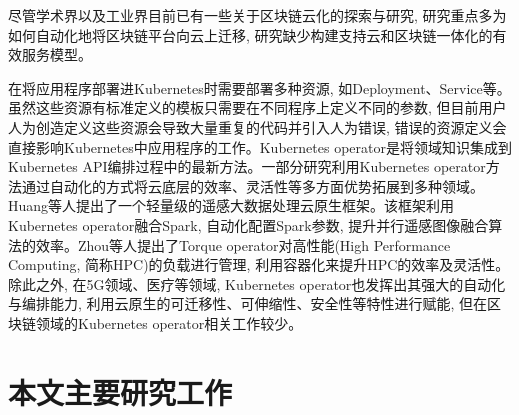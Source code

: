 尽管学术界以及工业界目前已有一些关于区块链云化的探索与研究, 研究重点多为如何自动化地将区块链平台向云上迁移, 研究缺少构建支持云和区块链一体化的有效服务模型\cite{9582270}。

在将应用程序部署进Kubernetes时需要部署多种资源, 如Deployment、Service等。虽然这些资源有标准定义的模板只需要在不同程序上定义不同的参数, 但目前用户人为创造定义这些资源会导致大量重复的代码并引入人为错误, 错误的资源定义会直接影响Kubernetes中应用程序的工作。Kubernetes operator是将领域知识集成到Kubernetes API编排过程中的最新方法\cite{henning2021reproducible}。一部分研究利用Kubernetes operator方法通过自动化的方式将云底层的效率、灵活性等多方面优势拓展到多种领域。Huang等人\cite{huang2021fly}提出了一个轻量级的遥感大数据处理云原生框架。该框架利用Kubernetes operator融合Spark, 自动化配置Spark参数, 提升并行遥感图像融合算法的效率。Zhou等人\cite{zhou2021container}提出了Torque operator对高性能(High Performance Computing, 简称HPC)的负载进行管理, 利用容器化来提升HPC的效率及灵活性。除此之外, 在5G领域\cite{arouk20205g}\cite{wiranata2020automation}、医疗\cite{rouzbeh2020unified}等领域, Kubernetes operator也发挥出其强大的自动化与编排能力, 利用云原生的可迁移性、可伸缩性、安全性等特性进行赋能, 但在区块链领域的Kubernetes operator相关工作较少。


\section{本文主要研究工作}








